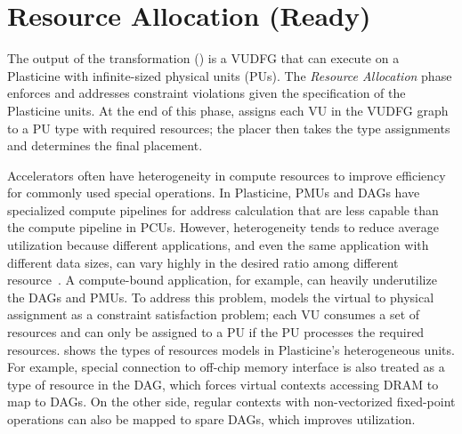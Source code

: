 \section{Resource Allocation (Ready)} \label{sec:decompose}

The output of the transformation () is a VUDFG that 
can execute on a Plasticine with infinite-sized physical units (PUs).
The \emph{Resource Allocation} phase enforces and addresses constraint violations given 
the specification of the Plasticine units. 
At the end of this phase, \name assigns each VU in the VUDFG graph to a PU type with required
resources; the placer then takes the type assignments and determines the final placement.

Accelerators often have heterogeneity in compute resources to improve efficiency for commonly used
special operations.
In Plasticine, PMUs and DAGs have specialized compute pipelines for address calculation that are 
less capable than the compute pipeline in PCUs.
However, heterogeneity tends to reduce average utilization because different applications, and even the same
application with different data sizes, can vary highly in the desired ratio among different
resource~\cite{lstml}.
A compute-bound application, for example, can heavily underutilize the DAGs and PMUs.
To address this problem, \name models the virtual to physical assignment as a constraint satisfaction problem; 
each VU consumes a set of resources and can only be assigned to a PU if the PU processes the required resources. 
 shows the types of resources \name models in Plasticine's heterogeneous units.
For example, special connection to off-chip memory interface is
also treated as a type of resource in the DAG, which forces virtual contexts accessing DRAM to map to DAGs. 
On the other side, regular contexts with non-vectorized fixed-point operations can also be mapped to
spare DAGs, which improves utilization.
